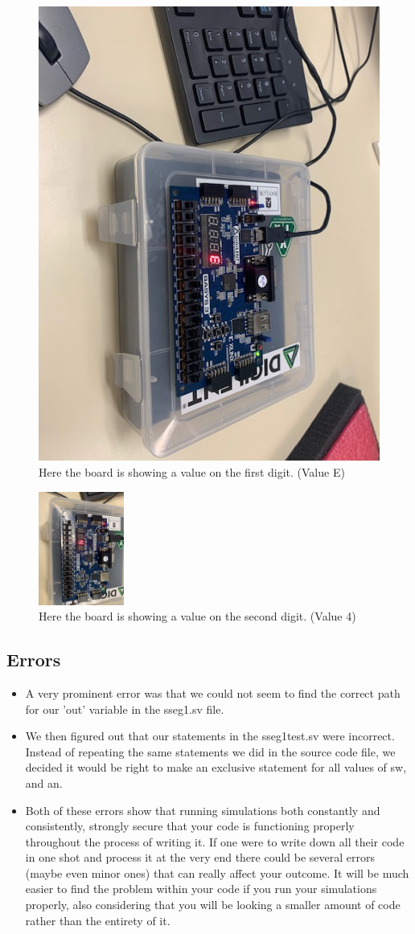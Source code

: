 \documentclass[11pt]{article}
\begin{document}
\begin{figure}[ht]\centering
	\includegraphics[width=.35\textwidth, trim=0cm 0cm 0cm 0cm,clip]{E}
	\caption{Here the board is showing a value on the first digit. (Value E)}
	\label{fig:Board-firstdigit}	
\end{figure}

\begin{figure}[ht]\centering
	\includegraphics[width=0.25\textwidth, angle = 90, trim=0cm 0cm 0cm 0cm,clip]{4(2)}
	\caption{Here the board is showing a value on the second digit. (Value 4)}
	\label{fig:Board-seconddigit}	
\end{figure}

\subsection*{Errors}

	\begin{itemize}
		\item A very prominent error was that we could not seem to find the correct path for our 'out' variable in the sseg1.sv file.
		\item We then figured out that our statements in the sseg1test.sv were incorrect. Instead of repeating the same statements we did in the source code file, we decided it would be right to make an exclusive statement for all values of sw, and an.
		\item Both of these errors show that running simulations both constantly and consistently, strongly secure that your code is functioning properly throughout the process of writing it. If one were to write down all their code in one shot and process it at the very end there could be several errors (maybe even minor ones) that can really affect your outcome. It will be much easier to find the problem within your code if you run your simulations properly, also considering that you will be looking a smaller amount of code rather than the entirety of it.
		
		 
	\end{itemize}
\end{document}

